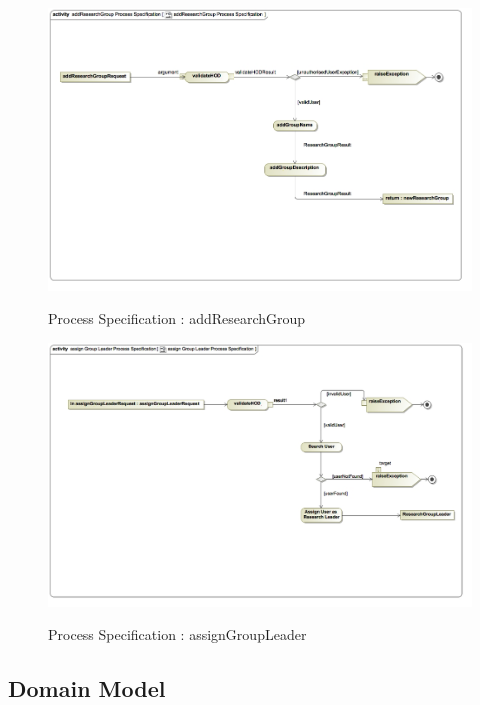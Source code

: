 \documentclass{article}
\begin{document}
		\begin{figure}[H]
			\includegraphics[width=\textwidth]{Vuyani_Diagrams/addResearchGroupProcess Specification.jpg}  \\
			\caption{Process Specification : addResearchGroup}
		\end{figure}
		\begin{figure}[H]
			\includegraphics[width=\textwidth]{Vuyani_Diagrams/assignGroupLeaderProcessSpecification.jpg}  \\
			\caption{Process Specification : assignGroupLeader}
		\end{figure}
		
	
	
\newpage

	\subsection{Domain Model}
	
\end{document}
